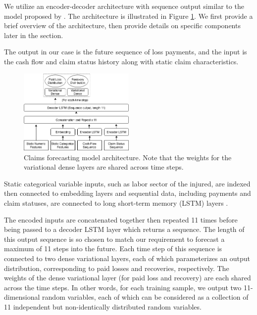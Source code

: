 \documentclass{article}
\begin{document}
We utilize an encoder-decoder architecture with sequence output similar to the model proposed by \cite{kuo2018deeptriangle}. The architecture is illustrated in Figure \ref{fig:architecture}. We first provide a brief overview of the architecture, then provide details on specific components later in the section.

The output in our case is the future sequence of loss payments, and the input is the cash flow and claim status history along with static claim characteristics.

\begin{figure}
  \begin{center}
    \includegraphics[width=0.5\textwidth]{images/architecture.png}
  \end{center}
  \caption{Claims forecasting model architecture. Note that the weights for the variational dense layers are shared across time steps.}
  \label{fig:architecture}
\end{figure}

Static categorical variable inputs, such as labor sector of the injured, are indexed then connected to embedding layers \cite{guo2016entity} and sequential data, including payments and claim statuses, are connected to long short-term memory (LSTM) layers \cite{hochreiter1997long}.

The encoded inputs are concatenated together then repeated 11 times before being passed to a decoder LSTM layer which returns a sequence. The length of this output sequence is so chosen to match our requirement to forecast a maximum of 11 steps into the future. Each time step of this sequence is connected to two dense variational layers, each of which parameterizes an output distribution, corresponding to paid losses and recoveries, respectively. The weights of the dense variational layer (for paid loss and recovery) are each shared across the time steps. In other words, for each training sample, we output two 11-dimensional random variables, each of which can be considered as a collection of 11 independent but non-identically distributed random variables.
\end{document}
